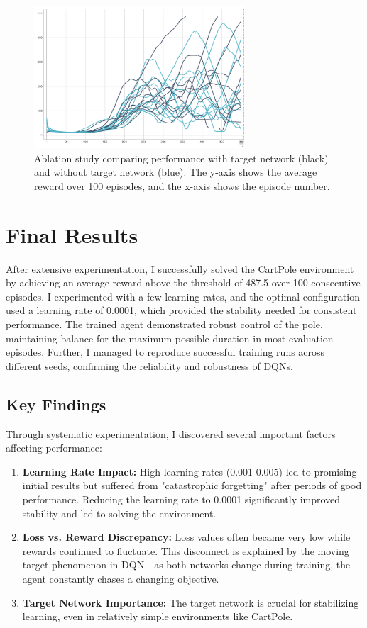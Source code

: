 \documentclass{article}
\begin{document}
\begin{figure}[h]
  \centering
  \includegraphics[width=0.7\textwidth]{media/target_ablation.png}
  \caption{Ablation study comparing performance with target network (black) and without target network (blue). The y-axis shows the average reward over 100 episodes, and the x-axis shows the episode number.}
  \label{fig:target_ablation}
  \end{figure}

\section{Final Results}
After extensive experimentation, I successfully solved the CartPole environment by achieving an average reward above the threshold of 487.5 over 100 consecutive episodes. I experimented with a few learning rates, and the optimal configuration used a learning rate of 0.0001, which provided the stability needed for consistent performance. The trained agent demonstrated robust control of the pole, maintaining balance for the maximum possible duration in most evaluation episodes. Further, I managed to reproduce successful training runs across different seeds, confirming the reliability and robustness of DQNs.

\subsection{Key Findings}
Through systematic experimentation, I discovered several important factors affecting performance:

\begin{enumerate}
    \item \textbf{Learning Rate Impact:} High learning rates (0.001-0.005) led to promising initial results but suffered from "catastrophic forgetting" after periods of good performance. Reducing the learning rate to 0.0001 significantly improved stability and led to solving the environment.
    
    \item \textbf{Loss vs. Reward Discrepancy:} Loss values often became very low while rewards continued to fluctuate. This disconnect is explained by the moving target phenomenon in DQN - as both networks change during training, the agent constantly chases a changing objective.
    
    \item \textbf{Target Network Importance:} The target network is crucial for stabilizing learning, even in relatively simple environments like CartPole.
\end{enumerate}
\end{document}

